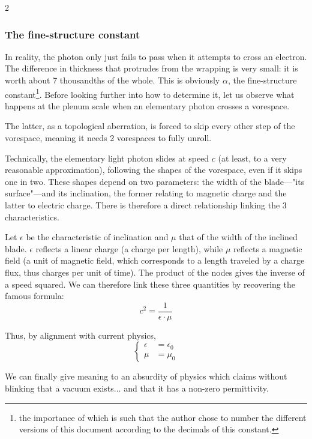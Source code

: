 \begin{multicols}{2}
	\subsubsection{The fine-structure constant}
	
	In reality, the photon only just fails to pass when it attempts to cross an electron. The difference in thickness that protrudes from the wrapping is very small: it is worth about 7 thousandths of the whole. This is obviously $\alpha$, the fine-structure constant\footnote{the importance of which is such that the author chose to number the different versions of this document according to the decimals of this constant.}. Before looking further into how to determine it, let us observe what happens at the plenum scale when an elementary photon crosses a vorespace.
	
	The latter, as a topological aberration, is forced to skip every other step of the vorespace, meaning it needs 2 vorespaces to fully unroll.
	
	Technically, the elementary light photon slides at speed $c$ (at least, to a very reasonable approximation), following the shapes of the vorespace, even if it skips one in two. These shapes depend on two parameters: the width of the blade—"its surface"—and its inclination, the former relating to magnetic charge and the latter to electric charge. There is therefore a direct relationship linking the 3 characteristics.
	
	Let $\epsilon$ be the characteristic of inclination and $\mu$ that of the width of the inclined blade. $\epsilon$ reflects a linear charge (a charge per length), while $\mu$ reflects a magnetic field (a unit of magnetic field, which corresponds to a length traveled by a charge flux, thus charges per unit of time). The product of the nodes gives the inverse of a speed squared. We can therefore link these three quantities by recovering the famous formula:
	\begin{equation*}
		c^2 = \frac{1} {\epsilon \cdot \mu}
	\end{equation*}
	
	Thus, by alignment with current physics,
	\begin{equation*}
		\left\{
		\begin{split}
			\epsilon &= \epsilon_0 \\
			\mu      &= \mu_0
		\end{split}
		\right.
	\end{equation*}
	
	We can finally give meaning to an absurdity of physics which claims without blinking that a vacuum exists$\ldots$ and that it has a non-zero permittivity.
	

\end{multicols}
